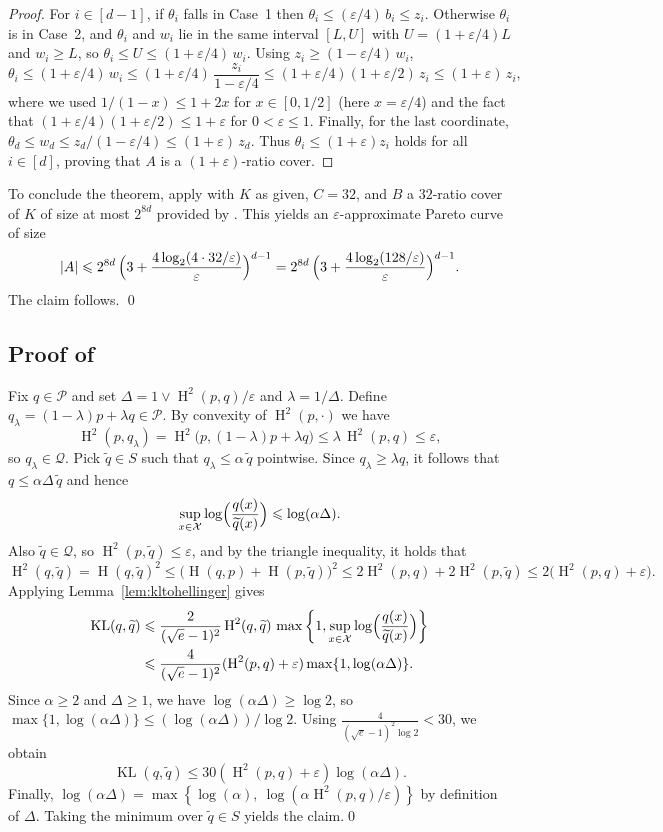 \documentclass[11pt]{article}
\renewcommand{\le}{\leqslant}
\renewcommand{\ge}{\geqslant}
\newcommand{\eps}{\varepsilon}
\newcommand{\X}{\mathcal{X}}
\renewcommand{\triangleq}{=}
\renewcommand{\tilde}{\widetilde}
\newcommand{\kl}{\operatorname{KL}}
\newcommand{\hel}{\operatorname{H}}
\newcommand{\hels}{\hel^2}
\theoremstyle{definition}
\theoremstyle{remark}
\begin{document}
\begin{proof}
For $i\in[d-1]$, if $\theta_i$ falls in Case~1 then $\theta_i \le (\eps/4)\,b_i \le z_i$.
Otherwise $\theta_i$ is in Case~2, and $\theta_i$ and $w_i$ lie in the same interval $[L,U]$ with $U=(1+\eps/4)L$ and $w_i\ge L$, so $\theta_i \le U \le (1+\eps/4)\,w_i$.
Using $z_i \ge (1-\eps/4)\,w_i$,
\[
\theta_i \le (1+\eps/4)\,w_i \le (1+\eps/4)\,\frac{z_i}{1-\eps/4}
\le (1+\eps/4)(1+\eps/2)\,z_i \le (1+\eps)\,z_i,
\]
where we used $1/(1-x)\le 1+2x$ for $x\in[0,1/2]$ (here $x=\eps/4$) and the fact that $(1+\eps/4)(1+\eps/2)\le 1+\eps$ for $0<\eps\le 1$.
Finally, for the last coordinate, $\theta_d \le w_d \le z_d/(1-\eps/4)\le (1+\eps)\,z_d$.
Thus $\theta_i \le (1+\eps)z_i$ holds for all $i\in[d]$, proving that $A$ is a $(1+\eps)$-ratio cover.
\end{proof}

To conclude the theorem, apply  with $K$ as given, $C=32$, and $B$ a $32$-ratio cover of $K$ of size at most $2^{8d}$ provided by .
This yields an $\eps$-approximate Pareto curve of size
\[
|A|
 \le 2^{8d}\,\Bigl(3 + \frac{4\log_2(4\cdot 32/\eps)}{\eps}\Bigr)^{d-1}
 = 2^{8d}\,\Bigl(3 + \frac{4\log_2(128/\eps)}{\eps}\Bigr)^{d-1}.
\]
The claim follows. \qed

\subsection[Proof of Lemma~\ref{lemma:kl-from-ball}]{Proof of }


Fix $q\in\mathcal P$ and set $\Delta\triangleq 1\vee \hels(p,q)/\eps$ and $\lambda\triangleq 1/\Delta$.
Define $q_\lambda\triangleq (1-\lambda)p+\lambda q\in\mathcal P$.
By convexity of $\hels(p,\cdot)$ we have
\[
\hels(p,q_\lambda)=\hels\bigl(p,(1-\lambda)p+\lambda q\bigr)\le \lambda\,\hels(p,q)\le \eps,
\]
so $q_\lambda\in\mathcal Q$. Pick $\tilde q\in S$ such that $q_\lambda\le \alpha\,\tilde q$ pointwise.
Since $q_\lambda\ge \lambda q$, it follows that $q\le \alpha\Delta\,\tilde q$ and hence
\[
\sup_{x\in\X}\log\Bigl(\frac{q(x)}{\tilde q(x)}\Bigr)\le \log(\alpha\Delta).
\]
Also $\tilde q\in\mathcal Q$, so $\hels(p,\tilde q)\le \eps$, and by the triangle inequality, it holds that 
\[
\hels(q,\tilde q)=\hel(q,\tilde q)^2
\le \bigl(\hel(q,p)+\hel(p,\tilde q)\bigr)^2
\le 2\hels(p,q)+2\hels(p,\tilde q)
\le 2\bigl(\hels(p,q)+\eps\bigr).
\]
Applying Lemma~\ref{lem:kltohellinger} gives
\begin{align*}
\kl(q,\tilde q)
&\le
\frac{2}{(\sqrt e-1)^2}\hels(q,\tilde q)\,
\max\left\{1,\sup_{x\in\X}\log\Bigl(\frac{q(x)}{\tilde q(x)}\Bigr)\right\}
\\
&\le
\frac{4}{(\sqrt e-1)^2}(\hels(p,q)+\eps)\max\{1,\log(\alpha\Delta)\}.
\end{align*}
Since $\alpha\ge 2$ and $\Delta\ge 1$, we have $\log(\alpha\Delta)\ge \log 2$, so $\max\{1,\log(\alpha\Delta)\}\le (\log(\alpha\Delta))/\log 2$.
Using $\frac{4}{(\sqrt e-1)^2\log 2}<30$, we obtain
\[
\kl(q,\tilde q)\le 30(\hels(p,q)+\eps)\log(\alpha\Delta).
\]
Finally, $\log(\alpha\Delta)=\max\left\{\log(\alpha),\ \log\left(\alpha\hels(p,q)/\eps\right)\right\}$ by definition of $\Delta$.
Taking the minimum over $\tilde q\in S$ yields the claim.\qed
\end{document}
